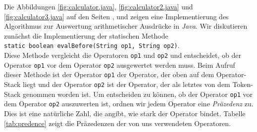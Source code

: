 \noindent
Die Abbildungen \ref{fig:calculator.java}, \ref{fig:calculator2.java} und
\ref{fig:calculator3.java}
auf den Seiten \pageref{fig:calculator.java}, \pageref{fig:calculator2.java} und
\pageref{fig:calculator3.java} zeigen  eine Implementierung des Algorithmus
zur Auswertung arithmetischer Ausdr\"ucke in \textsl{Java}.
Wir diskutieren zun\"achst die Implementierung der statischen Methode \\[0.1cm]
\hspace*{1.3cm} \texttt{static boolean evalBefore(String op1, String op2)}.\\[0.1cm]
Diese Methode vergleicht die Operatoren \texttt{op1} und \texttt{op2} und entscheidet, ob
der Operator \texttt{op1} vor dem Operator \texttt{op2} ausgewertet werden muss.
Beim Aufruf dieser Methode
ist der Operator \texttt{op1} der Operator, der oben auf dem Operator-Stack liegt
und der Operator \texttt{op2} ist der Operator, der als letztes von dem Token-Stack
genommen worden ist.
Um entscheiden zu k\"onnen, ob der Operator \texttt{op1}
vor dem Operator \texttt{op2} auszuwerten ist, ordnen wir jedem
Operator eine \emph{Pr\"azedenz} zu.  Dies ist eine nat\"urliche Zahl, die angibt, wie stark
der Operator bindet. Tabelle \ref{tab:predence} zeigt die Pr\"azedenzen der von uns
verwendeten Operatoren.

\begin{table}[!h]
  \centering
{}
  \caption{Pr\"azedenzen der Operatoren.}
  \label{tab:predence}
\end{table}


